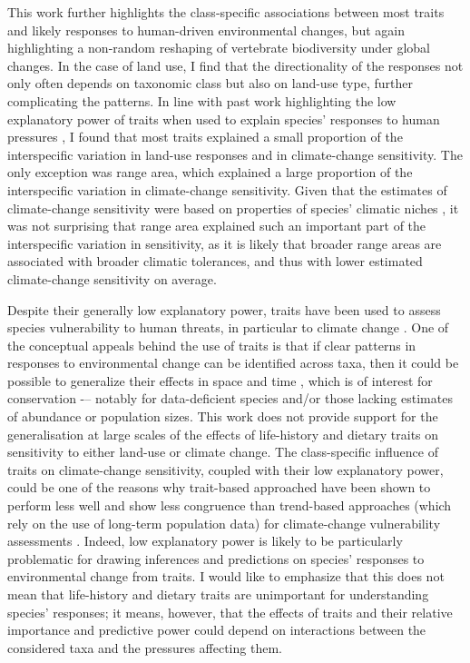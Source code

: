 This work further highlights the class-specific associations between most traits and likely responses to human-driven environmental changes, but again highlighting a non-random reshaping of vertebrate biodiversity under global changes. In the case of land use, I find that the directionality of the responses not only often depends on taxonomic class but also on land-use type, further complicating the patterns. In line with past work highlighting the low explanatory power of traits when used to explain species' responses to human pressures \citep{Angert2011, Verberk2013, Cannistra2021}, I found that most traits explained a small proportion of the interspecific variation in land-use responses and in climate-change sensitivity. The only exception was range area, which explained a large proportion of the interspecific variation in climate-change sensitivity. Given that the estimates of climate-change sensitivity were based on properties of species' climatic niches \citep{Rinnan2019}, it was not surprising that range area explained such an important part of the interspecific variation in sensitivity, as it is likely that broader range areas are associated with broader climatic tolerances, and thus with lower estimated climate-change sensitivity on average.

Despite their generally low explanatory power, traits have been used to assess species vulnerability to human threats, in particular to climate change \citep{Foden2013, Bohm2016}. One of the conceptual appeals behind the use of traits is that if clear patterns in responses to environmental change can be identified across taxa, then it could be possible to generalize their effects in space and time \citep{Verberk2013, Hamilton2020}, which is of interest for conservation -– notably for data-deficient species and/or those lacking estimates of abundance or population sizes. This work does not provide support for the generalisation at large scales of the effects of life-history and dietary traits on sensitivity to either land-use or climate change. The class-specific influence of traits on climate-change sensitivity, coupled with their low explanatory power, could be one of the reasons why trait-based approached have been shown to perform less well and show less congruence than trend-based approaches (which rely on the use of long-term population data) for climate-change vulnerability assessments \citep{Wheatley2017}. Indeed, low explanatory power is likely to be particularly problematic for drawing inferences and predictions on species' responses to environmental change from traits. I would like to emphasize that this does not mean that life-history and dietary traits are unimportant for understanding species' responses; it means, however, that the effects of traits and their relative importance and predictive power could depend on interactions between the considered taxa and the pressures affecting them.  

